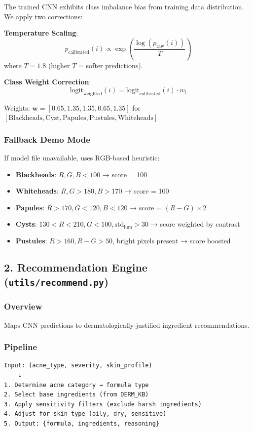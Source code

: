 \documentclass[12pt,a4paper]{article}
\begin{document}
The trained CNN exhibits class imbalance bias from training data distribution. We apply two corrections:

\textbf{Temperature Scaling}:
$$p_{\text{calibrated}}(i) \propto \exp\left(\frac{\log(p_{\text{raw}}(i))}{T}\right)$$
where $T = 1.8$ (higher $T$ = softer predictions).

\textbf{Class Weight Correction}:
$$\text{logit}_{\text{weighted}}(i) = \text{logit}_{\text{calibrated}}(i) \cdot w_i$$

Weights: $\mathbf{w} = [0.65, 1.35, 1.35, 0.65, 1.35]$ for $[\text{Blackheads}, \text{Cyst}, \text{Papules}, \text{Pustules}, \text{Whiteheads}]$

\subsubsection{Fallback Demo Mode}

If model file unavailable, uses RGB-based heuristic:
\begin{itemize}
    \item \textbf{Blackheads}: $R,G,B < 100$ → score = 100
    \item \textbf{Whiteheads}: $R,G > 180, B > 170$ → score = 100
    \item \textbf{Papules}: $R > 170, G < 120, B < 120$ → score = $(R-G) \times 2$
    \item \textbf{Cysts}: $130 < R < 210, G < 100, \text{std}_{\text{lum}} > 30$ → score weighted by contrast
    \item \textbf{Pustules}: $R > 160, R-G > 50$, bright pixels present → score boosted
\end{itemize}

\subsection{2. Recommendation Engine (\texttt{utils/recommend.py})}

\subsubsection{Overview}
Maps CNN predictions to dermatologically-justified ingredient recommendations.

\subsubsection{Pipeline}

\begin{lstlisting}
Input: (acne_type, severity, skin_profile)
    ↓
1. Determine acne category → formula type
2. Select base ingredients (from DERM_KB)
3. Apply sensitivity filters (exclude harsh ingredients)
4. Adjust for skin type (oily, dry, sensitive)
5. Output: {formula, ingredients, reasoning}
\end{lstlisting}
\end{document}
